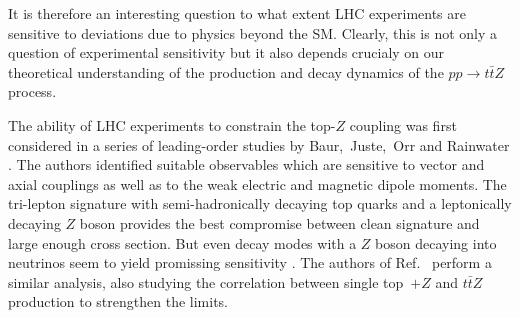\documentclass[preprint]{JHEP3} %
\def\ttbZ{t\bar{t}Z}
\begin{document}
It is therefore an interesting question to what extent LHC experiments are sensitive to deviations due to physics beyond the SM.
Clearly, this is not only a question of experimental sensitivity but it also depends crucialy on our theoretical understanding of the production and decay dynamics of the $pp\to\ttbZ$ process.

The ability of LHC experiments to constrain the top-$Z$ coupling was first considered in a series of leading-order studies by Baur,~Juste,~Orr and Rainwater \cite{Baur:2004uw,Baur:2005wi,one more Baur paper}. 
The authors identified suitable observables which are sensitive to vector and axial couplings as well as to the weak electric and magnetic dipole moments.
The tri-lepton signature with semi-hadronically decaying top quarks and a leptonically decaying $Z$ boson provides the best compromise between
clean signature and large enough cross section. 
But even decay modes with a $Z$ boson decaying into neutrinos seem to yield promissing sensitivity \cite{Baur:2005wi}.
The authors of Ref.~\cite{Berger:2009hi} perform a similar analysis, also studying the correlation between single top~$+Z$ and $\ttbZ$ production to strengthen the limits.
\end{document}
